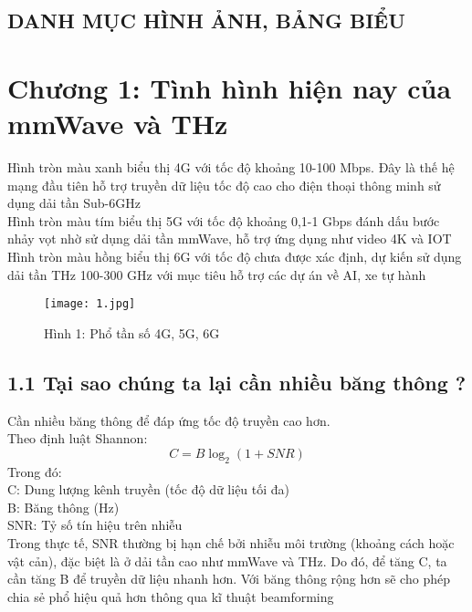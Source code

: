 \documentclass[a4paper,13pt]{article} %
\begin{document}
\renewcommand{\contentsname}{}
\tableofcontents %
\clearpage

\begin{center}
\section{DANH MỤC HÌNH ẢNH, BẢNG BIỂU}
\end{center}
\listoffigures
\clearpage


\section{Chương 1: Tình hình hiện nay của mmWave và THz}
Hình tròn màu xanh biểu thị 4G với tốc độ khoảng 10-100 Mbps. Đây là thế hệ mạng đầu tiên hỗ trợ truyền dữ liệu tốc độ cao cho điện thoại thông minh sử dụng dải tần Sub-6GHz \\
Hình tròn màu tím biểu thị 5G với tốc độ khoảng 0,1-1 Gbps đánh dấu bước nhảy vọt nhờ sử dụng dải tần mmWave, hỗ trợ ứng dụng như video 4K và IOT \\
Hình tròn màu hồng biểu thị 6G với tốc độ chưa được xác định, dự kiến sử dụng dải tần THz 100-300 GHz với mục tiêu hỗ trợ các dự án về AI, xe tự hành
\begin{figure}[htbp]
    \centering
    \texttt{[image: 1.jpg]}
    \caption*{Hình 1: Phổ tần số 4G, 5G, 6G \cite{key1} }
    \label{fig:model}
\end{figure}
\subsection{1.1 Tại sao chúng ta lại cần nhiều băng thông ?}
Cần nhiều băng thông để đáp ứng tốc độ truyền cao hơn. \\ Theo định luật Shannon: 
\begin{equation}
C = B \log_2(1 + SNR) \tag{1}
\end{equation}
Trong đó: \\
C: Dung lượng kênh truyền (tốc độ dữ liệu tối đa) \\
B: Băng thông (Hz) \\
SNR: Tỷ số tín hiệu trên nhiễu\\

Trong thực tế, SNR thường bị hạn chế bởi nhiễu môi trường (khoảng cách hoặc vật cản), đặc biệt là ở dải tần cao như mmWave và THz. Do đó, để tăng C, ta cần tăng B để truyền dữ liệu nhanh hơn. Với băng thông rộng hơn sẽ cho phép chia sẻ phổ hiệu quả hơn thông qua kĩ thuật beamforming\\
\end{document}
